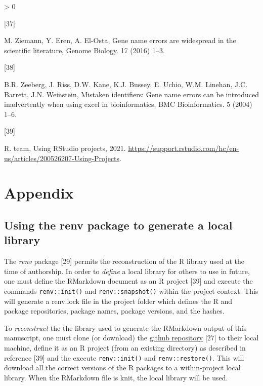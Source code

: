 \documentclass[]{elsarticle} %
\newlength{\csllabelwidth}
\newlength{\cslhangindent}
\newenvironment{CSLReferences}[3] %
 {%
  \setlength{\parindent}{0pt}
  \ifodd #1 \everypar{\setlength{\hangindent}{\cslhangindent}}\ignorespaces\fi
  \ifnum #2 > 0
  \setlength{\parskip}{#2\baselineskip}
  \fi
 }%
 {}
\newcommand{\CSLLeftMargin}[1]{\parbox[t]{\csllabelwidth}{#1}}
\newcommand{\CSLRightInline}[1]{\parbox[t]{\linewidth - \csllabelwidth}{#1}}
\begin{document}
\begin{CSLReferences}{0}{0}
\leavevmode\hypertarget{ref-ziemann2016gene}{}%
\CSLLeftMargin{{[}37{]} }
\CSLRightInline{M. Ziemann, Y. Eren, A. El-Osta, Gene name errors are
widespread in the scientific literature, Genome Biology. 17 (2016)
1--3.}

\leavevmode\hypertarget{ref-zeeberg2004mistaken}{}%
\CSLLeftMargin{{[}38{]} }
\CSLRightInline{B.R. Zeeberg, J. Riss, D.W. Kane, K.J. Bussey, E. Uchio,
W.M. Linehan, J.C. Barrett, J.N. Weinstein, Mistaken identifiers: Gene
name errors can be introduced inadvertently when using excel in
bioinformatics, BMC Bioinformatics. 5 (2004) 1--6.}

\leavevmode\hypertarget{ref-rprojects}{}%
\CSLLeftMargin{{[}39{]} }
\CSLRightInline{R. team, Using RStudio projects, 2021.
\url{https://support.rstudio.com/hc/en-us/articles/200526207-Using-Projects}.}

\end{CSLReferences}

\hypertarget{appendix}{%
\section*{Appendix}\label{appendix}}

\hypertarget{using-the-renv-package-to-generate-a-local-library}{%
\subsection*{Using the renv package to generate a local
library}\label{using-the-renv-package-to-generate-a-local-library}}

The \emph{renv} package {[}29{]} permits the reconstruction of the R
library used at the time of authorship. In order to \emph{define} a
local library for others to use in future, one must define the RMarkdown
document as an R project {[}39{]} and execute the commands
\texttt{renv::init()} and \texttt{renv::snapshot()} within the project
context. This will generate a renv.lock file in the project folder which
defines the R and package repositories, package names, package versions,
and the hashes.

To \emph{reconstruct} the the library used to generate the RMarkdown
output of this manuscript, one must clone (or download) the
\href{https://github.com/drdanholmes/jmsacl_reproducible_research}{github
repository} {[}27{]} to their local machine, define it as an R project
(from an existing directory) as described in reference {[}39{]} and the
execute \texttt{renv::init()} and \texttt{renv::restore()}. This will
download all the correct versions of the R packages to a within-project
local library. When the RMarkdown file is knit, the local library will
be used.
\end{document}
